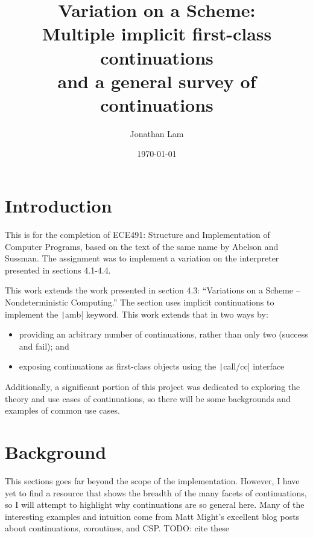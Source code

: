 \documentclass[]{article}
\begin{document}
\title{Variation on a Scheme:\\Multiple implicit first-class continuations\\
  \vspace{6pt}
  \large{} and a general survey of continuations}
\author{Jonathan Lam}
\date{\today{}}

\maketitle{}

\section{Introduction}
\label{sec:intr}

This is for the completion of ECE491: Structure and Implementation of Computer Programs, based on the text of the same name by Abelson and Sussman. The assignment was to implement a variation on the interpreter presented in sections 4.1-4.4.

This work extends the work presented in section 4.3: ``Variations on a Scheme -- Nondeterministic Computing.'' The section uses implicit continuations to implement the \texttt|amb| keyword. This work extends that in two ways by:
\begin{itemize}
\item providing an arbitrary number of continuations, rather than only two (success and fail); and
\item exposing continuations as first-class objects using the \texttt|call/cc| interface
\end{itemize}

Additionally, a significant portion of this project was dedicated to exploring the theory and use cases of continuations, so there will be some backgrounds and examples of common use cases.

\section{Background}
\label{sec:back}

This sections goes far beyond the scope of the implementation. However, I have yet to find a resource that shows the breadth of the many facets of continuations, so I will attempt to highlight why continuations are so general here. Many of the interesting examples and intuition come from Matt Might's excellent blog posts about continuations, coroutines, and CSP. TODO: cite these
\end{document}
